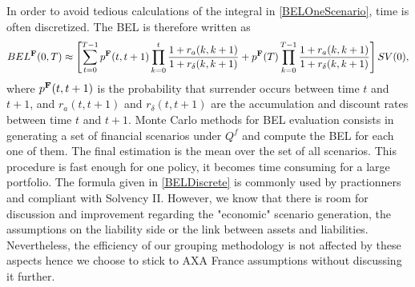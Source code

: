 In order to avoid tedious calculations of the integral in \eqref{BELOneScenario}, time is often discretized. The BEL is therefore written as
\begin{equation}\label{BELDiscrete}
BEL^{\bold{F}}(0,T)\approx\left[\sum_{t=0}^{T-1}p^{\bold{F}}(t,t+1)\prod^{t}_{k=0}\frac{1+r_{a}(k,k+1)}{1+r_{\delta}(k,k+1)}+p^{\bold{F}}(T)\prod^{T-1}_{k=0}\frac{1+r_{a}(k,k+1)}{1+r_{\delta}(k,k+1)}\right]SV(0),
\end{equation}
where $p^{\bold{F}}(t,t+1)$ is the probability that surrender occurs between time $t$ and $t+1$, and $r_{a}(t,t+1)$ and $r_{\delta}(t,t+1)$ are the accumulation and discount rates between time $t$ and $t+1$. Monte Carlo methods for BEL evaluation consists in generating a set of financial scenarios under $Q^{f}$ and compute the BEL for each one of them. The final estimation is the mean over the set of all scenarios. This procedure is fast enough for one policy, it becomes time consuming for a large portfolio. The formula given in \eqref{BELDiscrete} is commonly used by practionners and compliant with Solvency II. However, we know that there is room for discussion and improvement regarding the "economic" scenario generation, the assumptions on the liability side or the link between assets and liabilities. Nevertheless, the efficiency of our grouping methodology is not affected by these aspects hence we choose to stick to AXA France assumptions without discussing it further.   

